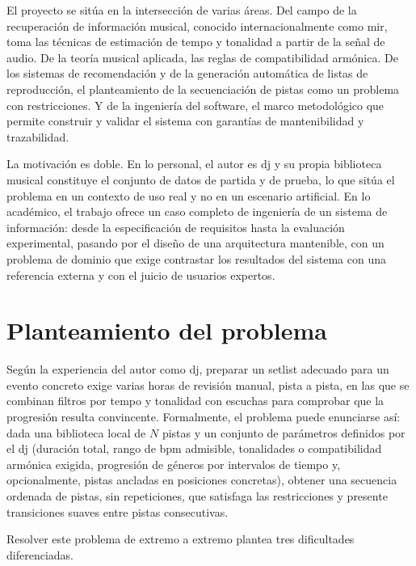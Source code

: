 El proyecto se sitúa en la intersección de varias áreas. Del campo de la recuperación de información musical, conocido internacionalmente como \acf{mir}, toma las técnicas de estimación de tempo y tonalidad a partir de la señal de audio. De la teoría musical aplicada, las reglas de compatibilidad armónica. De los sistemas de recomendación y de la generación automática de listas de reproducción, el planteamiento de la secuenciación de pistas como un problema con restricciones. Y de la ingeniería del software, el marco metodológico que permite construir y validar el sistema con garantías de mantenibilidad y trazabilidad.

La motivación es doble. En lo personal, el autor es \acs{dj} y su propia biblioteca musical constituye el conjunto de datos de partida y de prueba, lo que sitúa el problema en un contexto de uso real y no en un escenario artificial. En lo académico, el trabajo ofrece un caso completo de ingeniería de un sistema de información: desde la especificación de requisitos hasta la evaluación experimental, pasando por el diseño de una arquitectura mantenible, con un problema de dominio que exige contrastar los resultados del sistema con una referencia externa y con el juicio de usuarios expertos.

\section{Planteamiento del problema}
\label{sec:intro-problema}

Según la experiencia del autor como \acs{dj}, preparar un setlist adecuado para un evento concreto exige varias horas de revisión manual, pista a pista, en las que se combinan filtros por tempo y tonalidad con escuchas para comprobar que la progresión resulta convincente. Formalmente, el problema puede enunciarse así: dada una biblioteca local de $N$ pistas y un conjunto de parámetros definidos por el \acs{dj} (duración total, rango de \acs{bpm} admisible, tonalidades o compatibilidad armónica exigida, progresión de géneros por intervalos de tiempo y, opcionalmente, pistas ancladas en posiciones concretas), obtener una secuencia ordenada de pistas, sin repeticiones, que satisfaga las restricciones y presente transiciones suaves entre pistas consecutivas.

Resolver este problema de extremo a extremo plantea tres dificultades diferenciadas.

